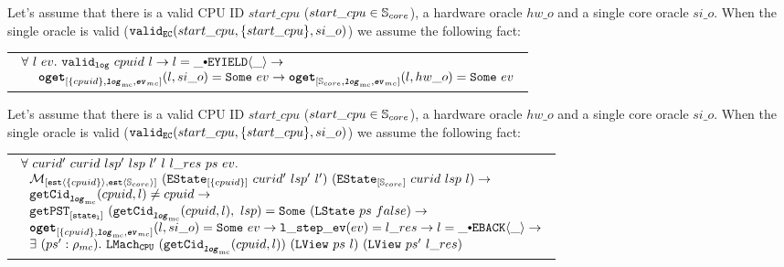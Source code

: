 \begin{hypothesis}
\label{hypothesis:chapter:conlink:related-single-oracle-hw-oracle}
Let's assume that there is a valid CPU ID $start\_cpu$
($start\_cpu \in {\mathbb{S}_{core}}$),  a hardware oracle $hw\_o$
and a single core oracle $si\_o$.
When the single oracle is valid ($ {{\mathrm{\texttt{valid}}}_{{\mathrm{\texttt{EC}}}}}({start\_cpu}, {\{start\_cpu\}}, {si\_o})$) we assume the following fact:
\begin{center}
\begin{tabular}{P{0.95\textwidth}}
$
\begin{array}{l}
\forall \ l \ ev  . \ \validlog{cpuid}{l} \rightarrow l = \listconsoppo{\yieldev{\_}}{\_} \rightarrow\\
\ \ \ \ \oget{\set{cpuid}}{\mclog}{\mcevent}{l}{si\_o}{ev} \rightarrow \oget{\coreset}{\mclog}{\mcevent}{l}{hw\_o}{ev} \\
\end{array}
$
\end{tabular}
\end{center}
\end{hypothesis}


\begin{hypothesis}
\label{hypothesis:chapter:conlink:related-single-oracle-concrete-step}
Let's assume that there is a valid CPU ID $start\_cpu$ ($start\_cpu \in {\mathbb{S}_{core}}$),  a hardware oracle $hw\_o$
and a single core oracle $si\_o$.
When the single oracle is valid ($ {{\mathrm{\texttt{valid}}}_{{\mathrm{\texttt{EC}}}}}({start\_cpu}, {\{start\_cpu\}}, {si\_o})$) we assume the following fact:
\begin{center}
\begin{tabular}{P{0.95\textwidth}}
$
\begin{array}{l}
\forall \ curid' \ curid \ lsp' \ lsp \ l' \ l \ l\_res \ ps \ ev . \\
\ \ \matchestateestate{\set{cpuid}}{(\envstate{\set{cpuid}}{curid'}{lsp'}{l'})}{(\envstate{\coreset}{curid}{lsp}{l})} \rightarrow\\
\ \ \getcuridfromlognoeq{cpuid}{l} \neq cpuid \rightarrow \\
\ \ \getpstsome{\localstatekwd}{\getcuridfromlognoeq{cpuid}{l}}{lsp}{(\localstate{ps}{false})} \rightarrow \\
\ \ \oget{\set{cpuid}}{\mclog}{\mcevent}{l}{si\_o}{ev} \rightarrow \localstepev{ev}{l\_res} \rightarrow l = \listconsoppo{\yieldbackev{\_}}{\_} \rightarrow \\
\ \ \exists\ (ps' : \privatestate) . \ \hardwarelocalstep{(\getcuridfromlognoeq{cpuid}{l})}{(\localview{ps}{l})}{(\localview{ps'}{l\_res})} \\
\end{array}
$
\end{tabular}
\end{center}
\end{hypothesis}

